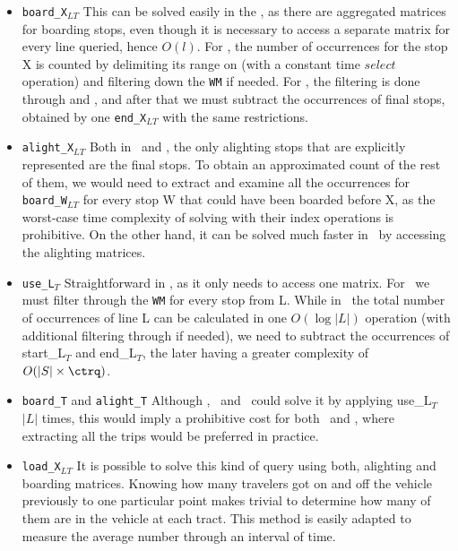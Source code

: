     \begin{itemize}
        \item \texttt{board\_X$_{LT}$} This can be solved easily in the \acumm, as there are aggregated matrices for boarding stops, even though it is necessary to access a separate matrix for every line queried, hence $O(l)$. For \ttctr, the number of occurrences for the stop X is counted by delimiting its range on  (with a constant time $select$ operation) and filtering down the \texttt{WM} if needed. For \ctr, the filtering is done through  and , and after that we must subtract the occurrences of final stops, obtained by one \texttt{end\_X$_{LT}$} with the same restrictions.
        \item \texttt{alight\_X$_{LT}$} Both in \ttctr~and \ctr, the only alighting stops that are explicitly represented are the final stops. To obtain an approximated count of the rest of them, we would need to extract and examine all the occurrences for \texttt{board\_W$_{LT}$} for every stop W that could have been boarded before X, as the worst-case time complexity of solving with their index operations is prohibitive. On the other hand, it can be solved much faster in \acumm~by accessing the alighting matrices.
        \item \texttt{use\_L$_T$} Straightforward in \acumm, as it only needs to access one matrix. For \ttctr~we must filter through the \texttt{WM} for every stop from L. While in \ctr~the total number of occurrences of line L can be calculated in one $O(\log|L|)$ operation (with additional filtering through  if needed), we need to subtract the occurrences of start\_L$_T$ and end\_L$_T$, the later having a greater complexity of $O(|S| \times \ctrq)$.
        \item \texttt{board\_T} and \texttt{alight\_T} Although \acumm, \ttctr~and \ctr~could solve it by applying use\_L$_T$ $|L|$ times, this would imply a prohibitive cost for both \ttctr~and \ctr, where extracting all the trips would be preferred in practice.
        \item \texttt{load\_X$_{LT}$} It is possible to solve this kind of query using both, alighting and boarding matrices. Knowing how many travelers got on and off the vehicle previously to one particular point makes trivial to determine how many of them are in the vehicle at each tract. This method is easily adapted to measure the average number through an interval of time.

\end{itemize}
